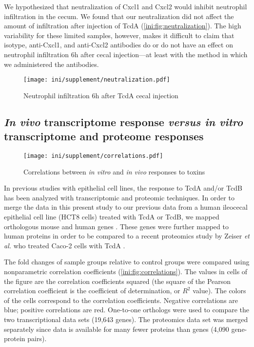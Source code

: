 We hypothesized that neutralization of Cxcl1 and Cxcl2
would inhibit neutrophil infiltration in the cecum. We found that 
our neutralization did not affect the amount of infiltration after injection
of TcdA (\autoref{ini:fig:neutralization}). The high variability for these 
limited samples, however,
makes it difficult to claim that isotype, anti-Cxcl1, and anti-Cxcl2 antibodies
do or do not have an effect on neutrophil infiltration 6h after cecal injection---at 
least with the method in which we administered the antibodies.

\begin{figure}[ht]
\centering
\texttt{[image: ini/supplement/neutralization.pdf]}
\caption{Neutrophil infiltration 6h after TcdA cecal injection}
\label{ini:fig:neutralization}
\end{figure}


\subsection{\emph{In vivo} transcriptome response \emph{versus
            in vitro} transcriptome and proteome responses}

\begin{figure}[b!]
\centering
\texttt{[image: ini/supplement/correlations.pdf]}
\caption{Correlations between \emph{in vitro} and \emph{in vivo} responses to toxins}
\label{ini:fig:correlations}
\end{figure}

In previous studies with epithelial cell lines, the response 
to TcdA and/or TcdB has been analyzed with transcriptomic and 
proteomic techniques. In order to merge the data in this present study
to our previous data from a human ileocecal epithelial
cell line (HCT8 cells) treated with TcdA or TcdB, we mapped orthologous
mouse and human genes \cite{DAuria:2012bd}. These genes were further mapped
to human proteins in order to be compared to a recent proteomics study
by Zeiser \emph{et al.} who treated Caco-2 cells with TcdA \cite{Zeiser:2013cu}.

The fold changes of sample groups relative
to control groups were compared using nonparametric correlation
coefficients (\autoref{ini:fig:correlations}). The values in cells of the figure
are the correlation coefficients squared (the square of the Pearson
correlation coefficient is the coefficient of determination, or $R^2$ value).
The colors of the cells correspond to the correlation coefficients. Negative
correlations are blue; positive correlations are red.
One-to-one orthologs were used to compare the two
transcriptional data sets (19,643 genes). The proteomics data
set was merged separately since data is available for many fewer
proteins than genes (4,090 gene-protein pairs).

